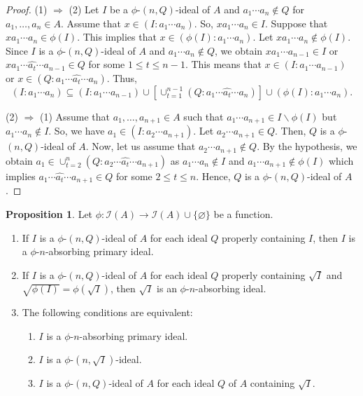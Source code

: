 \documentclass[preprint,review,10pt]{amsart}
\theoremstyle{definition}
\newtheorem{proposition}[theorem]{Proposition}
\theoremstyle{remark}
\numberwithin{equation}{section}
\begin{document}
\begin{proof}
(1) $\Longrightarrow$ (2) Let $I$ be a $\phi$-$(n,Q)$-ideal of $A$ and  $a_1 \cdots a_n \notin Q$ for $a_1,\ldots, a_n \in A$. Assume that $x \in (I: a_1 \cdots a_n)$. So, $xa_1 \cdots a_n \in I$. Suppose that $xa_1 \cdots a_n \in   \phi(I).$ This implies that $x \in (\phi(I):a_1 \cdots a_n)$. Let $xa_1 \cdots a_n  \notin \phi(I).$ Since $I$ is a $\phi$-$(n,Q)$-ideal of $A$ and $a_1 \cdots a_n \notin Q$, we obtain $xa_1 \cdots a_{n-1} \in I$ or $xa_1 \cdots \widehat{a_t} \cdots a_{n-1} \in Q$ for some $1 \leq t \leq n-1$. This means that   $x \in (I:a_1 \cdots a_{n-1})$ or $x \in (Q:a_1 \cdots \widehat{a_t} \cdots a_n)$. Thus, \[(I: a_1 \cdots a_n) \subseteq (I:a_1 \cdots a_{n-1}) \cup [\cup_{t=1}^{n-1}(Q:a_1 \cdots \widehat{a_t} \cdots a_n)] \cup (\phi(I):a_1 \cdots a_n).\]

(2) $\Longrightarrow$ (1) Assume that  $a_1,\ldots,a_{n+1} \in A$ such that $a_1\cdots a_{n+1} \in I \backslash \phi(I)$ but $a_1\cdots   a_n \notin I$. So, we have $a_1 \in  (I:a_2 \cdots a_{n+1})$. Let $a_2 \cdots a_{n+1} \in Q$. Then, $Q$ is a $\phi$-$(n,Q)$-ideal of $A$. Now, let us assume that  $a_2 \cdots a_{n+1} \notin Q$. By the hypothesis, we obtain $a_1 \in \cup_{t=2}^{n}(Q:a_2 \cdots \widehat{a_t} \cdots a_{n+1})$ as $a_1 \cdots  a_n \notin I$ and $a_1 \cdots a_{n+1} \notin \phi(I)$ which implies $a_1\cdots \widehat{a_t} \cdots a_{n+1} \in Q $ for some $2 \leq t \leq n$. Hence, $Q$ is a $\phi$-$(n,Q)$-ideal of $A$.
\end{proof}
\begin{proposition}
Let   $\phi: \mathcal{I}(A) \to \mathcal{I}(A) \cup \{\varnothing\}$ be a function.
\begin{enumerate}
\item If $I$ is a $\phi$-$(n,Q)$-ideal   of $A$ for each ideal $Q$   properly containing $I$, then $I$ is a $\phi$-$n$-absorbing primary ideal.
\item  If $I$ is a $\phi$-$(n,Q)$-ideal of $A$ for each ideal $Q$   properly containing $\sqrt{I}$ and $\sqrt{\phi(I)} =\phi(\sqrt{I})$, then $\sqrt{I}$ is an $\phi$-$n$-absorbing  ideal.
\item The following conditions are equivalent:
\begin{enumerate}
\item[(i)] $I$ is a $\phi$-$n$-absorbing primary ideal.
\item[(ii)] $I$ is a  $\phi$-$(n,\sqrt{I})$-ideal.
\item[(iii)] $I$ is a  $\phi$-$(n,Q)$-ideal of $A$ for each ideal $Q$ of $A$ containing $\sqrt{I}$.
\end{enumerate}
\end{enumerate}
\end{proposition}
\end{document}
